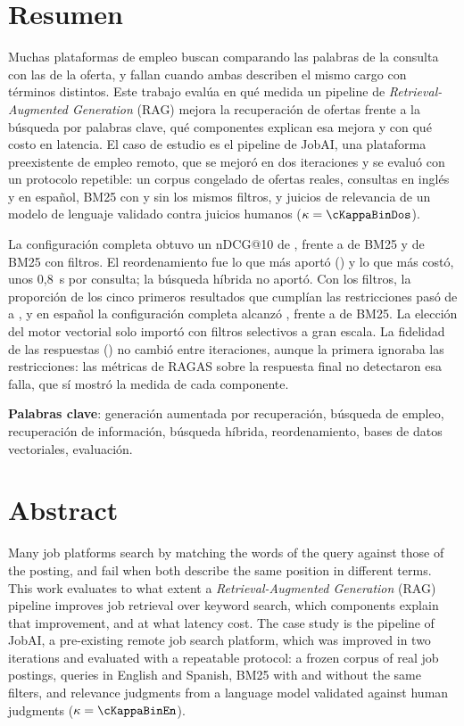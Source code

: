 \section*{Resumen}

Muchas plataformas de empleo buscan comparando las palabras de la consulta con las de la oferta, y fallan cuando ambas describen el mismo cargo con términos distintos. Este trabajo evalúa en qué medida un pipeline de \textit{Retrieval-Augmented Generation} (RAG) mejora la recuperación de ofertas frente a la búsqueda por palabras clave, qué componentes explican esa mejora y con qué costo en latencia. El caso de estudio es el pipeline de JobAI, una plataforma preexistente de empleo remoto, que se mejoró en dos iteraciones y se evaluó con un protocolo repetible: un corpus congelado de \cOfertas{} ofertas reales, \cConsultasPrueba{} consultas en inglés y en español, BM25 con y sin los mismos filtros, y juicios de relevancia de un modelo de lenguaje validado contra juicios humanos ($\kappa = \cKappaBinDos$).

La configuración completa obtuvo un nDCG@10 de \cNdcgCompletaDos, frente a \cNdcgBMDos{} de BM25 y \cNdcgBMFiltrosDos{} de BM25 con filtros. El reordenamiento fue lo que más aportó (\cDifReord) y lo que más costó, unos 0,8~s por consulta; la búsqueda híbrida no aportó. Con los filtros, la proporción de los cinco primeros resultados que cumplían las restricciones pasó de \cCumplDensoDos{} a \cCumplFiltrosDos, y en español la configuración completa alcanzó \cNdcgCompletaEsDos, frente a \cNdcgBMEsDos{} de BM25. La elección del motor vectorial solo importó con filtros selectivos a gran escala. La fidelidad de las respuestas (\cFidelidadDos) no cambió entre iteraciones, aunque la primera ignoraba las restricciones: las métricas de RAGAS sobre la respuesta final no detectaron esa falla, que sí mostró la medida de cada componente.

\textbf{Palabras clave}: generación aumentada por recuperación, búsqueda de empleo, recuperación de información, búsqueda híbrida, reordenamiento, bases de datos vectoriales, evaluación.

\newpage
\section*{Abstract}

Many job platforms search by matching the words of the query against those of the posting, and fail when both describe the same position in different terms. This work evaluates to what extent a \textit{Retrieval-Augmented Generation} (RAG) pipeline improves job retrieval over keyword search, which components explain that improvement, and at what latency cost. The case study is the pipeline of JobAI, a pre-existing remote job search platform, which was improved in two iterations and evaluated with a repeatable protocol: a frozen corpus of \cOfertasEn{} real job postings, \cConsultasPrueba{} queries in English and Spanish, BM25 with and without the same filters, and relevance judgments from a language model validated against human judgments ($\kappa = \cKappaBinEn$).

